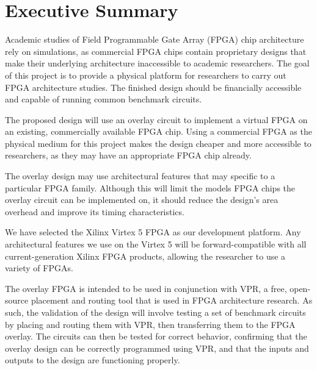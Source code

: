 \thispagestyle{empty}
\section*{Executive Summary}


Academic studies of Field Programmable Gate Array (FPGA) chip architecture rely on simulations, as commercial FPGA chips contain proprietary designs that make their underlying architecture inaccessible to academic researchers.
The goal of this project is to provide a physical platform for researchers to carry out FPGA architecture studies.
The finished design should be financially accessible and capable of running common benchmark circuits.

The proposed design will use an overlay circuit to implement a virtual FPGA on an existing, commercially available FPGA chip.
Using a commercial FPGA as the physical medium for this project makes the design cheaper and more accessible to researchers, as they may have an appropriate FPGA chip already.

The overlay design may use architectural features that may specific to a particular FPGA family.
Although this will limit the models FPGA chips the overlay circuit can be implemented on, it should reduce the design's area overhead and improve its timing characteristics.

We have selected the Xilinx Virtex 5 FPGA as our development platform.
Any architectural features we use on the Virtex 5 will be forward-compatible with all current-generation Xilinx FPGA products, allowing the researcher to use a variety of FPGAs.

The overlay FPGA is intended to be used in conjunction with VPR, a free, open-source placement and routing tool that is used in FPGA architecture research.
As such, the validation of the design will involve testing a set of benchmark circuits by placing and routing them with VPR, then transferring them to the FPGA overlay.
The circuits can then be tested for correct behavior, confirming that the overlay design can be correctly programmed using VPR, and that the inputs and outputs to the design are functioning properly.

